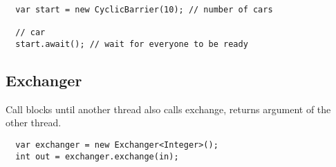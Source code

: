 \begin{verbatim}
  var start = new CyclicBarrier(10); // number of cars
  
  // car
  start.await(); // wait for everyone to be ready
\end{verbatim}

\subsection{Exchanger}
Call blocks until another thread also calls exchange, returns argument of the other thread.

\begin{verbatim}
  var exchanger = new Exchanger<Integer>();
  int out = exchanger.exchange(in);
\end{verbatim}